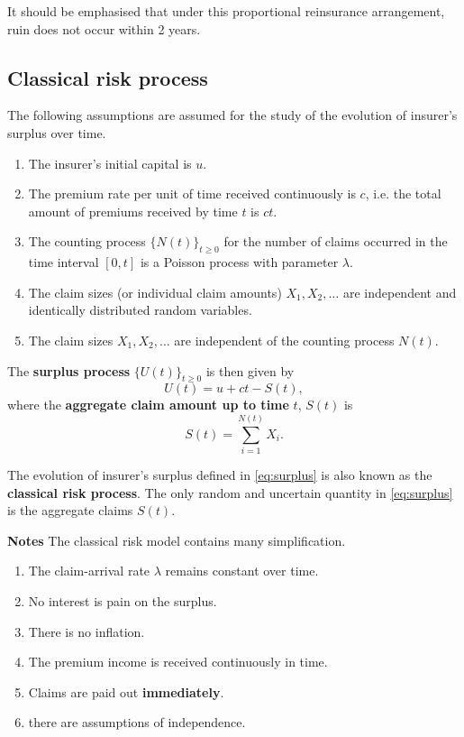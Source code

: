 \documentclass[landscape, 20pt]{extreport}
\theoremstyle{definition}
\theoremstyle{definition}
\theoremstyle{definition}
\theoremstyle{definition}
\theoremstyle{remark}
\begin{document}
It should be emphasised that under this proportional reinsurance arrangement, ruin does not occur within 2 years.

\hypertarget{classical-risk-process}{%
\subsection{Classical risk process}\label{classical-risk-process}}

The following assumptions are assumed for the study of the evolution of
insurer's surplus over time.

\begin{enumerate}
\def\labelenumi{\arabic{enumi}.}
\item
  The insurer's initial capital is \(u\).
\item
  The premium rate per unit of time received continuously is \(c\), i.e.
  the total amount of premiums received by time \(t\) is \(ct\).
\item
  The counting process \(\{N(t) \}_{t \ge 0}\) for the number of claims
  occurred in the time interval \([0,t]\) is a Poisson process with
  parameter \(\lambda\).
\item
  The claim sizes (or individual claim amounts) \(X_1, X_2, \ldots\) are
  independent and identically distributed random variables.
\item
  The claim sizes \(X_1, X_2, \ldots\) are independent of the counting
  process \(N(t)\).
\end{enumerate}

The \textbf{surplus process} \(\{U(t) \}_{t \ge 0}\) is then given by
\begin{equation}
\label{eq:surplus}
U(t) = u + ct - S(t),
\end{equation}
where the \textbf{aggregate claim amount up to time}
\(t\), \(S(t)\) is
\begin{equation}
\label{eq:St}
S(t) = \sum_{i = 1}^{N(t)} X_i .
\end{equation}

The evolution of insurer's surplus defined in \eqref{eq:surplus}
is also known as the \textbf{classical risk process}.
The only random and uncertain quantity in
\eqref{eq:surplus}
is the aggregate claims \(S(t)\).

\textbf{Notes} The classical risk model contains many simplification.

\begin{enumerate}
\def\labelenumi{\arabic{enumi}.}
\item
  The claim-arrival rate \(\lambda\) remains constant over time.
\item
  No interest is pain on the surplus.
\item
  There is no inflation.
\item
  The premium income is received continuously in time.
\item
  Claims are paid out \textbf{immediately}.
\item
  there are assumptions of independence.
\end{enumerate}
\end{document}
